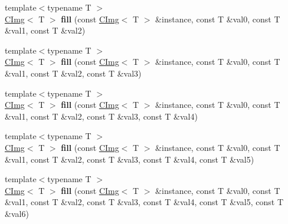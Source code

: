 \begin{DoxyCompactItemize}
\item 
\hypertarget{namespacecimg__library_aa77ad9bb9bd631f6894acb99812a1215}{{\footnotesize template$<$typename T $>$ }\\\hyperlink{structcimg__library_1_1_c_img}{C\-Img}$<$ T $>$ {\bfseries fill} (const \hyperlink{structcimg__library_1_1_c_img}{C\-Img}$<$ T $>$ \&instance, const T \&val0, const T \&val1, const T \&val2)}\label{namespacecimg__library_aa77ad9bb9bd631f6894acb99812a1215}

\item 
\hypertarget{namespacecimg__library_a9e9ca37eb9bd5af4f5465052ee01052e}{{\footnotesize template$<$typename T $>$ }\\\hyperlink{structcimg__library_1_1_c_img}{C\-Img}$<$ T $>$ {\bfseries fill} (const \hyperlink{structcimg__library_1_1_c_img}{C\-Img}$<$ T $>$ \&instance, const T \&val0, const T \&val1, const T \&val2, const T \&val3)}\label{namespacecimg__library_a9e9ca37eb9bd5af4f5465052ee01052e}

\item 
\hypertarget{namespacecimg__library_a1c49ad00a768844539a05b192b91a637}{{\footnotesize template$<$typename T $>$ }\\\hyperlink{structcimg__library_1_1_c_img}{C\-Img}$<$ T $>$ {\bfseries fill} (const \hyperlink{structcimg__library_1_1_c_img}{C\-Img}$<$ T $>$ \&instance, const T \&val0, const T \&val1, const T \&val2, const T \&val3, const T \&val4)}\label{namespacecimg__library_a1c49ad00a768844539a05b192b91a637}

\item 
\hypertarget{namespacecimg__library_a850d0c9514ae7c542269c12f048e4374}{{\footnotesize template$<$typename T $>$ }\\\hyperlink{structcimg__library_1_1_c_img}{C\-Img}$<$ T $>$ {\bfseries fill} (const \hyperlink{structcimg__library_1_1_c_img}{C\-Img}$<$ T $>$ \&instance, const T \&val0, const T \&val1, const T \&val2, const T \&val3, const T \&val4, const T \&val5)}\label{namespacecimg__library_a850d0c9514ae7c542269c12f048e4374}

\item 
\hypertarget{namespacecimg__library_a118c591a4e38602291a5876c0994b09d}{{\footnotesize template$<$typename T $>$ }\\\hyperlink{structcimg__library_1_1_c_img}{C\-Img}$<$ T $>$ {\bfseries fill} (const \hyperlink{structcimg__library_1_1_c_img}{C\-Img}$<$ T $>$ \&instance, const T \&val0, const T \&val1, const T \&val2, const T \&val3, const T \&val4, const T \&val5, const T \&val6)}\label{namespacecimg__library_a118c591a4e38602291a5876c0994b09d}


\end{DoxyCompactItemize}
